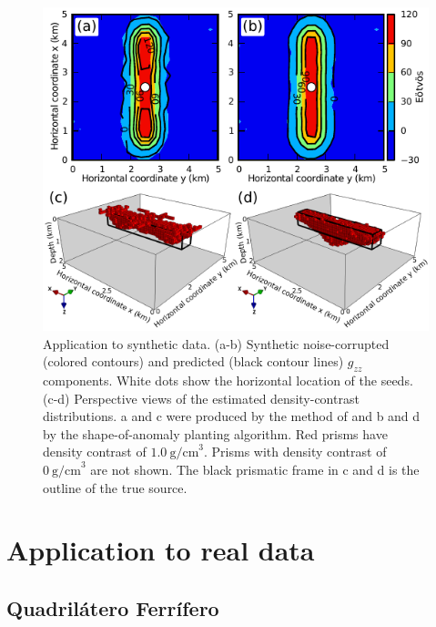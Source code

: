\documentclass{segabs}
\begin{document}
\begin{figure}[htb]
    \includegraphics[width=\columnwidth]{synthetic/fig/synthetic}
    \caption{Application to synthetic data. (a-b) Synthetic noise-corrupted
        (colored contours) and predicted (black contour lines)
        $g_{zz}$ components. White dots show the horizontal location
        of the seeds.
        (c-d) Perspective views of the estimated density-contrast distributions.
        a and c were produced by the method of \citet{Uieda2011} and
        b and d by the shape-of-anomaly planting algorithm.
        Red prisms have density contrast of $1.0\ \mathrm{g/cm}^3$.
        Prisms with density contrast of $0\ \mathrm{g/cm}^3$ are not shown.
        The black prismatic frame in c and d is the outline of the true source. 
    \label{fig:synthetic}}
\end{figure}

\section{Application to real data}

\subsection{Quadril\'atero Ferr\'ifero}
\end{document}

